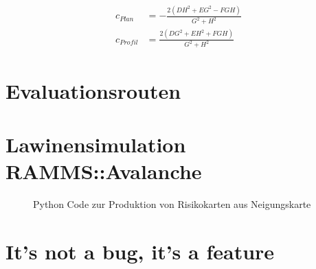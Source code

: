 \begin{align}
    c_{Plan} &= -\frac{{2(DH^2 + EG^2 - FGH)}}{{G^2 + H^2}}
    \\
    c_{Profil} &= \frac{{2(DG^2 + EH^2 + FGH)}}{{G^2 + H^2}}
\end{align}

\section{Evaluationsrouten}\label{app:evalroutes}









\section{Lawinensimulation {RAMMS::Avalanche}}

\begin{figure}[H]
  \centering
  \caption{Python Code zur Produktion von Risikokarten aus Neigungskarte}\label{fig:chelenalp2d}
\end{figure}

\section{It's not a bug, it's a feature}